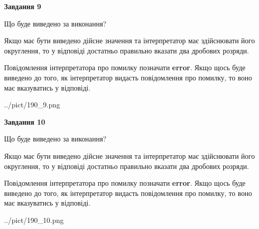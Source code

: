 \documentclass[12pt, ukrainian]{article}
\begin{document}
{\begin {Large}
{\begin {center}\textbf{Завдання 9}\end {center}}\par
Що буде виведено за виконання? \par

Якщо має бути виведено дійсне значення та інтерпретатор має здійснювати його округлення, 
то у відповіді достатньо правильно вказати два дробових розряди.

Повідомлення інтерпретатора про помилку позначати \textbf{error}.
Якщо щось буде виведено до того, як інтерпретатор видасть повідомлення про помилку, 
то воно має вказуватись у відповіді. \par

\begin{center}
	{../pict/190_9.png}
\end{center}
\newpage

{\begin {center}\textbf{Завдання 10}\end {center}}\par
Що буде виведено за виконання? \par

Якщо має бути виведено дійсне значення та інтерпретатор має здійснювати його округлення, 
то у відповіді достатньо правильно вказати два дробових розряди.

Повідомлення інтерпретатора про помилку позначати \textbf{error}.
Якщо щось буде виведено до того, як інтерпретатор видасть повідомлення про помилку, 
то воно має вказуватись у відповіді. \par

\begin{center}
	{../pict/190_10.png}
\end{center}
\newpage

\end {Large}}
\end{document}
